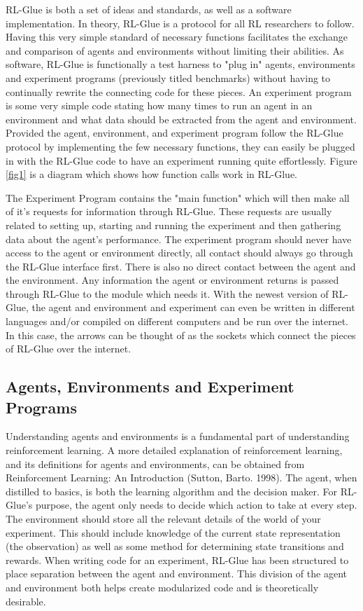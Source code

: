 \documentclass[11pt]{article}
\begin{document}
RL-Glue is both a set of ideas and standards, as well as a software implementation. In theory, RL-Glue is a protocol for all RL researchers to follow. Having this very simple standard of necessary functions facilitates the exchange and comparison of agents and environments without limiting their abilities. As software, RL-Glue is functionally a test harness to "plug in" agents, environments and experiment programs (previously titled benchmarks) without having to continually rewrite the connecting code for these pieces. An experiment program is some very simple code stating how many times to run an agent in an environment and what data should be extracted from the agent and environment. Provided the agent, environment, and experiment program follow the RL-Glue protocol by implementing the few necessary functions, they can easily be plugged in with the RL-Glue code to have an experiment running quite effortlessly. Figure \ref{fig1} is a diagram which shows how function calls work in RL-Glue.



The Experiment Program contains the "main function" which will then make all of it's requests for information through RL-Glue. These requests are usually related to setting up, starting and running the experiment and then gathering data about the agent's performance. The experiment program should never have access to the agent or environment directly, all contact should always go through the RL-Glue interface first.  There is also no direct contact between the agent and the environment. Any information the agent or environment returns is passed through RL-Glue to the module which needs it.  With the newest version of RL-Glue, the agent and environment and experiment can even be written in different languages and/or compiled on different computers and be run over the internet. In this case, the arrows can be thought of as the sockets which connect the pieces of RL-Glue over the internet.



\subsection{Agents, Environments and Experiment Programs}
Understanding agents and environments is a fundamental part of understanding reinforcement learning. A more detailed explanation of reinforcement learning, and its definitions for agents and environments, can be obtained from Reinforcement Learning: An Introduction (Sutton, Barto. 1998).  The agent, when distilled to basics, is both the learning algorithm and the decision maker. For RL-Glue's purpose, the agent only needs to decide which action to take at every step. The environment should store all the relevant details of the world of your experiment. This should include knowledge of the current state representation (the observation) as well as some method for determining state transitions and rewards. When writing code for an experiment, RL-Glue has been structured to place separation between the agent and environment. This division of the agent and environment both helps create modularized code and is theoretically desirable.
\end{document}
